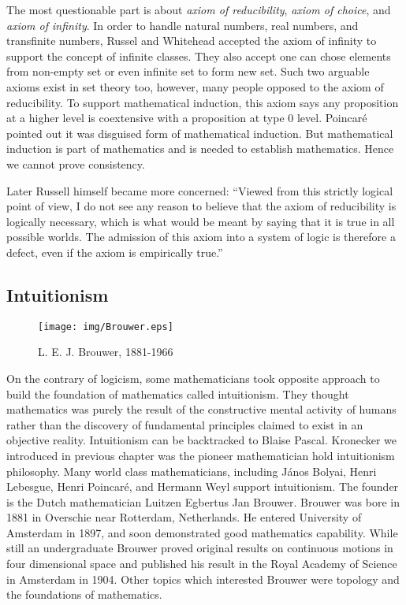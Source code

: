 \documentclass{article}
\begin{document}
The most questionable part is about {\em axiom of reducibility}, {\em axiom of choice}, and {\em axiom of infinity}. In order to handle natural numbers, real numbers, and transfinite numbers, Russel and Whitehead accepted the axiom of infinity to support the concept of infinite classes. They also accept one can chose elements from non-empty set or even infinite set to form new set. Such two arguable axioms exist in set theory too, however, many people opposed to the axiom of reducibility. To support mathematical induction, this axiom says any proposition at a higher level is coextensive with a proposition at type 0 level. Poincaré pointed out it was disguised form of mathematical induction. But mathematical induction is part of mathematics and is needed to establish mathematics. Hence we cannot prove consistency.

Later Russell himself became more concerned: ``Viewed from this strictly logical point of view, I do not see any reason to believe that the axiom of reducibility is logically necessary, which is what would be meant by saying that it is true in all possible worlds. The admission of this axiom into a system of logic is therefore a defect, even if the axiom is empirically true.''\cite{M-Kline-2007}

\subsection{Intuitionism}

\begin{wrapfigure}{L}{0.4\textwidth}
 \centering
 \texttt{[image: img/Brouwer.eps]}
 \captionsetup{labelformat=empty}
 \caption{L. E. J. Brouwer, 1881-1966}
 \label{fig:Brouwer}
\end{wrapfigure}

On the contrary of logicism, some mathematicians took opposite approach to build the foundation of mathematics called intuitionism. They thought mathematics was purely the result of the constructive mental activity of humans rather than the discovery of fundamental principles claimed to exist in an objective reality. Intuitionism can be backtracked to Blaise Pascal. Kronecker we introduced in previous chapter was the pioneer mathematician hold intuitionism philosophy. Many world class mathematicians, including János Bolyai, Henri Lebesgue, Henri Poincaré, and Hermann Weyl support intuitionism. The founder is the Dutch mathematician Luitzen Egbertus Jan Brouwer. Brouwer was bore in 1881 in Overschie near Rotterdam, Netherlands. He entered University of Amsterdam in 1897, and soon demonstrated good mathematics capability. While still an undergraduate Brouwer proved original results on continuous motions in four dimensional space and published his result in the Royal Academy of Science in Amsterdam in 1904. Other topics which interested Brouwer were topology and the foundations of mathematics.
\end{document}
